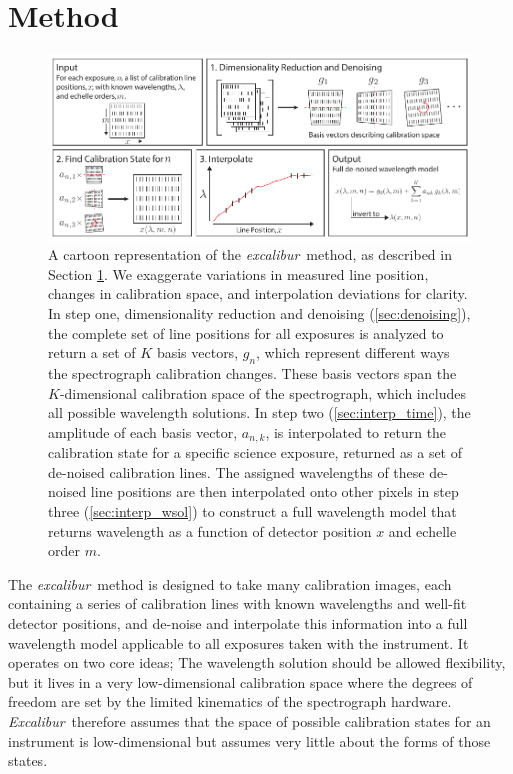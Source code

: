 \documentclass[twocolumn,table,xcolor,trackchanges]{aastex63}
\newcommand{\project}[1]{\textsl{#1}}
\newcommand{\name}{\project{excalibur}}
\newcommand{\Name}{\project{Excalibur}}
\begin{document}
\section{Method} \label{sec:method}
\begin{figure}[t]
\centering
\includegraphics[width=\textwidth]{Figures/methodCartoon.pdf}
\caption{A cartoon representation of the \name\ method, as described in Section \ref{sec:method}.  We exaggerate variations in measured line position, changes in calibration space, and interpolation deviations for clarity.  In step one, dimensionality reduction and denoising (\textsection \ref{sec:denoising}), the complete set of line positions for all exposures is analyzed to return a set of $K$ basis vectors, $g_n$, which represent different ways the spectrograph calibration changes.  These basis vectors span the $K$-dimensional calibration space of the spectrograph, which includes all possible wavelength solutions.  In step two (\textsection \ref{sec:interp_time}), the amplitude of each basis vector, $a_{n,k}$, is interpolated to return the calibration state for a specific science exposure, returned as a set of de-noised calibration lines.  The assigned wavelengths of these de-noised line positions are then interpolated onto other pixels in step three (\textsection \ref{sec:interp_wsol}) to construct a full wavelength model that returns wavelength as a function of detector position $x$ and echelle order $m$.}
\label{fig:cartoon}
\end{figure} 

The \name\ method is designed to take many calibration images, each containing a series of calibration lines with known wavelengths and well-fit detector positions, and de-noise and interpolate this information into a full wavelength model applicable to all exposures taken with the instrument.  It operates on two core ideas; The wavelength solution should be allowed flexibility, but it lives in a very low-dimensional calibration space where the degrees of freedom are set by the limited kinematics of the spectrograph hardware.  \Name\ therefore assumes that the space of possible calibration states for an instrument is low-dimensional but assumes very little about the forms of those states.
\end{document}
